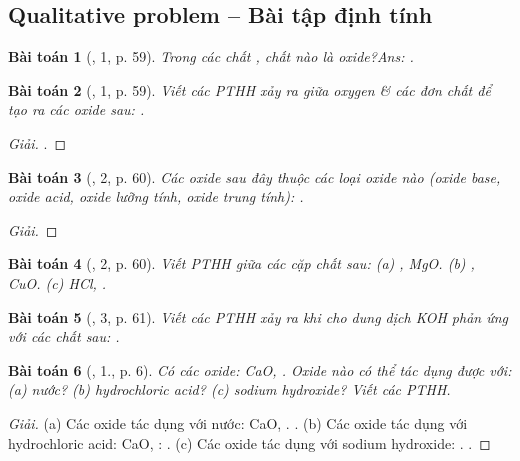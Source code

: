 \documentclass{article}
\newtheorem{baitoan}{Bài toán}
\begin{document}
\subsection{Qualitative problem -- Bài tập định tính}

\begin{baitoan}[\cite{SGK_KHTN_8_Canh_Dieu}, 1, p. 59]
	Trong các chất \emph{}, chất nào là oxide?\hfill{\sf Ans: .}
\end{baitoan}

\begin{baitoan}[\cite{SGK_KHTN_8_Canh_Dieu}, 1, p. 59]
	Viết các PTHH xảy ra giữa oxygen \& các đơn chất để tạo ra các oxide sau: \emph{}.
\end{baitoan}

\begin{proof}[Giải]
	.
\end{proof}

\begin{baitoan}[\cite{SGK_KHTN_8_Canh_Dieu}, 2, p. 60]
	Các oxide sau đây thuộc các loại oxide nào (oxide base, oxide acid, oxide lưỡng tính, oxide trung tính): \emph{}.
\end{baitoan}

\begin{proof}[Giải]
	
\end{proof}

\begin{baitoan}[\cite{SGK_KHTN_8_Canh_Dieu}, 2, p. 60]
	Viết PTHH giữa các cặp chất sau: (a) \emph{, MgO}. (b) \emph{, CuO}. (c) \emph{HCl, }.
\end{baitoan}

\begin{baitoan}[\cite{SGK_KHTN_8_Canh_Dieu}, 3, p. 61]
	Viết các PTHH xảy ra khi cho dung dịch \emph{KOH} phản ứng với các chất sau: \emph{}.
\end{baitoan}

\begin{baitoan}[\cite{SGK_Hoa_Hoc_9}, 1., p. 6]
	Có các oxide: \emph{CaO, }. Oxide nào có thể tác dụng được với: (a) nước? (b) hydrochloric acid? (c) sodium hydroxide? Viết các PTHH.
\end{baitoan}

\begin{proof}[Giải]
	(a) Các oxide tác dụng với nước: CaO, . . (b) Các oxide tác dụng với hydrochloric acid: CaO, : . (c) Các oxide tác dụng với sodium hydroxide: . .
\end{proof}
\end{document}
